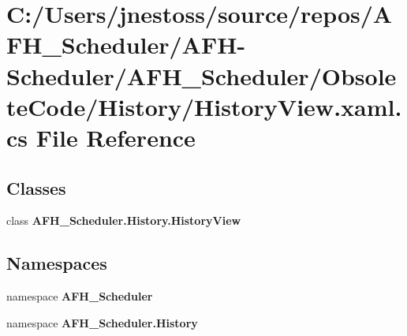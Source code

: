 \section{C\+:/\+Users/jnestoss/source/repos/\+A\+F\+H\+\_\+\+Scheduler/\+A\+F\+H-\/\+Scheduler/\+A\+F\+H\+\_\+\+Scheduler/\+Obsolete\+Code/\+History/\+History\+View.xaml.\+cs File Reference}
\label{_history_view_8xaml_8cs}
\subsection*{Classes}
\begin{DoxyCompactItemize}
\item 
class \textbf{ A\+F\+H\+\_\+\+Scheduler.\+History.\+History\+View}
\end{DoxyCompactItemize}
\subsection*{Namespaces}
\begin{DoxyCompactItemize}
\item 
namespace \textbf{ A\+F\+H\+\_\+\+Scheduler}
\item 
namespace \textbf{ A\+F\+H\+\_\+\+Scheduler.\+History}
\end{DoxyCompactItemize}
